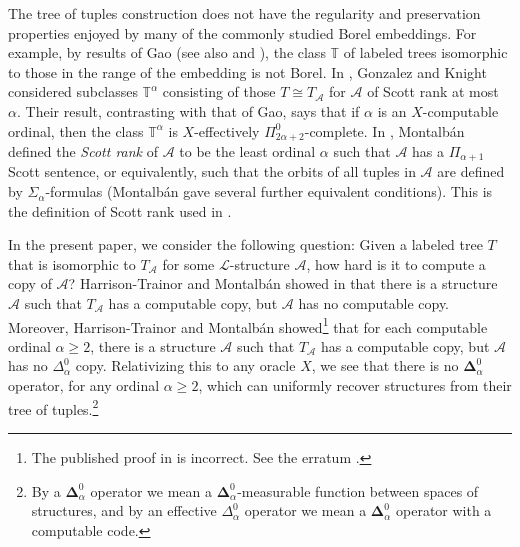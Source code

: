 \documentclass[10pt,a4paper]{article}
\newcommand{\bfDelta}{\boldsymbol{\Delta}}
\theoremstyle{definition}
\begin{document}
	The tree of tuples construction does not have the regularity and preservation properties enjoyed by many of the commonly studied Borel embeddings. For example, by results of Gao \cite{Gao} (see also \cite{GonzalezRossegger} and \cite{HTKim}), the class $\mathbb{T}$ of labeled trees isomorphic to those in the range of the embedding is not Borel. In \cite{GonzalezKnight}, Gonzalez and Knight considered subclasses $\mathbb{T}^\alpha$ consisting of those $T\cong T_\mathcal{A}$ for $\mathcal{A}$ of Scott rank at most $\alpha$. Their result, contrasting with that of Gao, says that if $\alpha$ is an $X$-computable ordinal, then the class $\mathbb{T}^\alpha$ is $X$-effectively $\Pi^0_{2\alpha+2}$-complete. In \cite{robuster}, Montalb\'{a}n defined the \emph{Scott rank} of $\mathcal{A}$ to be the least ordinal $\alpha$ such that $\mathcal{A}$ has a $\Pi_{\alpha+1}$ Scott sentence, or equivalently, such that the orbits of all tuples in $\mathcal{A}$ are defined by $\Sigma_\alpha$-formulas (Montalb\'{a}n gave several further equivalent conditions).  This is the definition of Scott rank used in \cite{GonzalezKnight}. 
	
	In the present paper, we consider the following question: Given a labeled tree $T$ that is isomorphic to $T_{\mathcal{A}}$ for some $\mathcal{L}$-structure $\mathcal{A}$, how hard is it to compute a copy of $\mathcal{A}$? Harrison-Trainor and Montalb\'an showed in \cite{HTMontalban} that there is a structure $\mathcal{A}$ such that $T_\mathcal{A}$ has a computable copy, but $\mathcal{A}$ has no computable copy. Moreover, Harrison-Trainor and Montalb\'an showed\footnote{The published proof in 
		\cite{HTMontalban} is incorrect. See the erratum \cite{errata}.} that for each computable ordinal $\alpha\geq 2$, there is a structure $\mathcal{A}$ such that $T_\mathcal{A}$ has a computable copy, but $\mathcal{A}$ has no $\Delta^0_\alpha$ copy. Relativizing this to any oracle $X$, we see that there is no $\bfDelta^0_\alpha$ operator, for any ordinal $\alpha\geq 2$, which can uniformly recover structures from their tree of tuples.\footnote{By a $\bfDelta^0_\alpha$ operator we mean a $\bfDelta^0_\alpha$-measurable function between spaces of structures, and by an effective $\Delta^0_\alpha$ operator we mean a $\bfDelta^0_\alpha$ operator with a computable code.}
	
\end{document}
